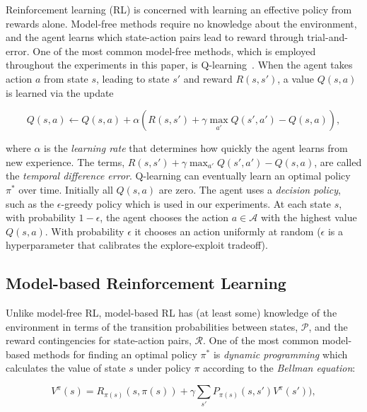 \documentclass[letterpaper]{article}
\begin{document}
Reinforcement learning (RL) is concerned with learning an effective policy from rewards alone. Model-free methods require no knowledge about the environment, and the agent learns which state-action pairs lead to reward through trial-and-error. One of the most common model-free methods, which is employed throughout the experiments in this paper, is Q-learning~\cite{sutton1998reinforcement}. When the agent takes action $a$ from state $s$, leading to state $s'$ and reward $R(s,s')$, a value $Q(s,a)$ is learned via the update

\begin{small}
\begin{equation}
Q(s,a) \leftarrow Q(s,a) + \alpha (R(s, s') + \gamma \max_{a'} Q(s', a') - Q(s,a)),
\end{equation}
\end{small}

\noindent
where $\alpha$ is the \textit{learning rate} that determines how quickly the agent learns from new experience. The terms, $R(s, s') + \gamma \max_{a'} Q(s', a') - Q(s,a)$, are called the \textit{temporal difference error}. Q-learning can eventually learn an optimal policy $\pi^*$ over time. Initially all $Q(s,a)$ are zero. The agent uses a \textit{decision policy}, such as the $\epsilon$-greedy policy which is used in our experiments. At each state $s$, with probability $1 - \epsilon$, the agent chooses the action $a \in \mathcal{A}$ with the highest value $Q(s,a)$. With probability $\epsilon$ it chooses an action uniformly at random ($\epsilon$ is a hyperparameter that calibrates the explore-exploit tradeoff).
 
\subsection{Model-based Reinforcement Learning}

Unlike model-free RL, model-based RL has (at least some) knowledge of the environment in terms of the transition probabilities between states, $\mathcal{P}$, and the reward contingencies for state-action pairs, $\mathcal{R}$. One of the most common model-based methods for finding an optimal policy $\pi^*$ is \textit{dynamic programming} which calculates the value of state $s$ under policy $\pi$ according to the \textit{Bellman equation}:

\begin{equation}
V^{\pi}(s) = R_{\pi(s)}(s,\pi(s)) + \gamma \sum\limits_{s'} P_{\pi(s)}(s,s')V^{\pi}(s')),
\end{equation}
\end{document}
